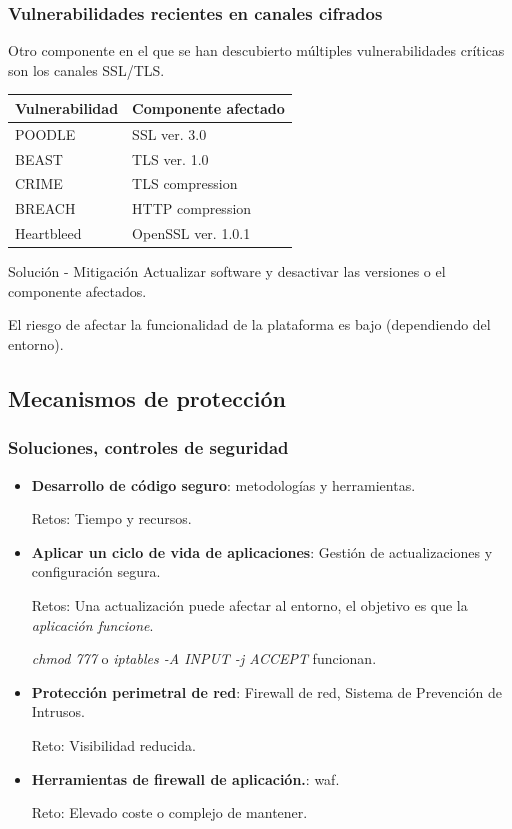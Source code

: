 \begin{frame}[shrink=20]
  \frametitle{Vulnerabilidades recientes en canales cifrados}
  Otro componente en el que se han descubierto múltiples vulnerabilidades críticas son los canales SSL/TLS.
  \begin{center}
    \begin{tabular}{|l|l|}
      \hline
      {\bf Vulnerabilidad}   			& {\bf Componente afectado}\\
      \hline
      POODLE											&   SSL ver. 3.0        \\
      \hline
      BEAST												&   TLS ver. 1.0        \\
      \hline
      CRIME                       &   TLS compression     \\
      \hline
      BREACH                      &   HTTP compression    \\
      \hline
      Heartbleed                  &   OpenSSL ver. 1.0.1  \\
      \hline
    \end{tabular}
  \end{center}
  \begin{block}{Solución - Mitigación}
    Actualizar software y desactivar las versiones o el componente afectados.
    \par El riesgo de afectar la funcionalidad de la plataforma es bajo (dependiendo del entorno).
  \end{block}
\end{frame}

\subsection{Mecanismos de protección}
\begin{frame}[shrink]
  \frametitle{Soluciones, controles de seguridad}
  \begin{itemize}
    \item {\bf Desarrollo de código seguro}: metodologías y herramientas.
      \par Retos: Tiempo y recursos.
    \item {\bf Aplicar un ciclo de vida de aplicaciones}: Gestión de actualizaciones y configuración segura.
      \par Retos: Una actualización puede afectar al entorno, el objetivo es que la {\em aplicación funcione}.
      \par {\em chmod 777} o {\em iptables -A INPUT -j ACCEPT} funcionan.
    \item {\bf Protección perimetral de red}: Firewall de red, Sistema de Prevención de Intrusos.
      \par Reto: Visibilidad reducida.
    \item {\bf Herramientas de firewall de aplicación.}: \acrshort{waf}.
      \par Reto: Elevado coste o complejo de mantener.
  \end{itemize}
\end{frame}

